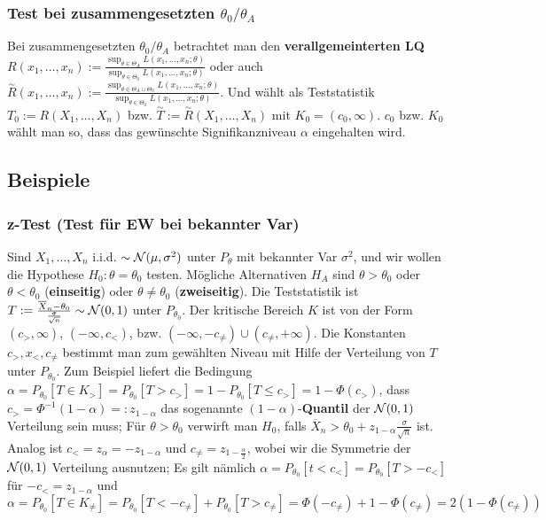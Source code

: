 \subsubsection{Test bei zusammengesetzten $\theta_0/\theta_A$}
Bei zusammengesetzten $\theta_0/\theta_A$ betrachtet man den \textbf{verallgemeinterten LQ} $R(x_1, \dots, x_n) := \frac{\sup_{\theta \in \Theta_A} L(x_1, \dots, x_n; \theta)}{\sup_{\theta \in \Theta_0}L(x_1, \dots, x_n; \theta)}$ oder auch $\overset{\sim}{R}(x_1, \dots, x_n) := \frac{\sup_{\theta \in \Theta_A \cup \Theta_0} L(x_1, \dots, x_n; \theta)}{\sup_{\theta \in \Theta_0}L(x_1, \dots, x_n; \theta)}$. Und wählt als Teststatistik $T_0 := R(X_1, \dots, X_n)$ bzw. $\overset{\sim}{T} := \overset{\sim}{R}(X_1, \dots, X_n)$ mit $K_0 = (c_0, \infty)$. $c_0$ bzw. $K_0$ wählt man so, dass das gewünschte Signifikanzniveau $\alpha$ eingehalten wird.

\subsection{Beispiele}
\subsubsection{z-Test (Test für EW bei bekannter Var)}
Sind $X_1, \dots, X_n$ i.i.d. $\sim \mathcal{N}(\mu, \sigma^2)$ unter $P_\theta$ mit bekannter Var $\sigma^2$, und wir wollen die Hypothese $H_0: \theta = \theta_0$ testen. Mögliche Alternativen $H_A$ sind $\theta > \theta_0$ oder $\theta < \theta_0$ (\textbf{einseitig}) oder $\theta \neq \theta_0$ (\textbf{zweiseitig}). Die Teststatistik ist $T := \frac{\overline{X}_n - \theta_0}{\frac{\sigma}{\sqrt{n}}} \sim \mathcal{N}(0, 1)$ unter $P_{\theta_0}$. Der kritische Bereich $K$ ist von der Form $(c_>, \infty)$, $(-\infty, c_<)$, bzw. $(-\infty, -c_{\neq}) \cup (c_{\neq}, + \infty)$. Die Konstanten $c_>, x_<, c_{\neq}$ bestimmt man zum gewählten Niveau mit Hilfe der Verteilung von $T$ unter $P_{\theta_0}$. Zum Beispiel liefert die Bedingung $\alpha = P_{\theta_0}[T \in K_>] = P_{\theta_0}[T > c_>] = 1 - P_{\theta_0}[T \le c_>] = 1 - \Phi(c_>)$, dass $c_> = \Phi^{-1}(1 - \alpha) =: z_{1 - \alpha}$ das sogenannte $(1 - \alpha)$-\textbf{Quantil} der $\mathcal{N}(0, 1)$ Verteilung sein muss; Für $\theta > \theta_0$ verwirft man $H_0$, falls $\overline{X}_n > \theta_0 + z_{1 - \alpha} \frac{\sigma}{\sqrt{n}}$ ist. Analog ist $c_< = z_\alpha = -z_{1 - \alpha}$ und $c_{\neq} = z_{1 - \frac{\alpha}{2}}$, wobei wir die Symmetrie der $\mathcal{N}(0, 1)$ Verteilung ausnutzen; Es gilt nämlich $\alpha = P_{\theta_0}[t < c_<] = P_{\theta_0}[T > -c_<]$ für $-c_< = z_{1 - \alpha}$ und $\alpha = P_{\theta_0}[T \in K_{\neq}] = P_{\theta_0} [T < -c_{\neq}] + P_{\theta_0}[T > c_{\neq}] = \Phi(-c_{\neq}) + 1 - \Phi(c_{\neq}) = 2(1 - \Phi(c_{\neq}))$

